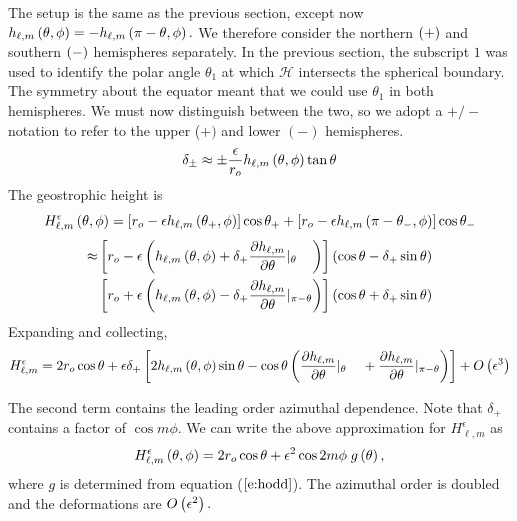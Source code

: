 The setup is the same as the previous section, except now $h_{\ell,m}\left ( \theta,\phi\right ) = -h_{\ell,m}\left ( \pi-\theta,\phi\right ).$
We therefore consider the northern $\left ( +\right ) $ and southern $\left ( -\right ) $ hemispheres separately. 
In the previous section, the subscript $1$ was used to identify the polar angle $\theta_{1}$ at which $\mathcal{H}$ intersects the spherical boundary. 
The symmetry about the equator meant that we could use $\theta_{1}$ in both hemispheres.
We must now distinguish between the two, so we adopt a $+/-$ notation to refer to the upper ($+)$ and lower $(-)$ hemispheres. 
\[\delta_{\pm}\approx \pm\frac{\epsilon}{r_{o}}h_{\ell,m}\left ( \theta,\phi\right ) \tan\theta \]
The geostrophic height is 
  \[H_{\ell,m}^{\epsilon}\lb \theta, \phi\rb = \ls r_{o}-\epsilon \hLM\lb \theta_{+},\phi\rb \rs \cos\theta_{+} +\ls r_{o}-\epsilon \hLM\lb \pi-\theta_{-},\phi\rb \rs \cos\theta_{-} \]
    \[
	    \begin{aligned}
		    \approx &\ls r_{o} - \epsilon \lb \hLM\lb \theta,\phi\rb  + \delta_{+} \frac{\partial \hLM}{\partial\theta}|_{\theta\phantom{\pi -}}\rb \rs \lb \cos \theta - \delta_{+}\sin\theta\rb \\
			    &\ls r_{o} + \epsilon \lb \hLM\lb \theta,\phi\rb  - \delta_{+} \frac{\partial \hLM}{\partial\theta}|_{\pi-\theta}\rb \rs \lb \cos \theta + \delta_{+}\sin \theta\rb
    \end{aligned}
    \]
     Expanding and collecting,
\begin{equation}
        H_{\ell,m}^{\epsilon} = 2 r_{o}\cos \theta + \epsilon \delta_{+}\ls 2\hLM \lb \theta,\phi\rb \sin\theta -  \cos\theta\lb\frac{\partial\hLM }{\partial\theta }|_{\theta\phantom{\pi-}} +\frac{\partial\hLM }{\partial\theta }|_{\pi-\theta}\rb\rs + O\lb \epsilon^{3}\rb
    	    \label{e:hodd}
\end{equation}

    The second term contains the leading order azimuthal dependence. Note that $\delta_{+}$ contains a factor of $\cos m\phi$. We can write the above approximation for $H_{\ell,m}^{\epsilon}$ as \[H_{\ell,m}^{\epsilon}\left ( \theta,\phi\right )= 2 r_{o} \cos\theta + \epsilon^{2}\cos 2m\phi \;g\left ( \theta\right ), \]
where $g$ is determined from equation ($\ref{e:hodd}$). 
The azimuthal order is doubled and the deformations are $O\left ( \epsilon^{2}\right ). $ 
    


